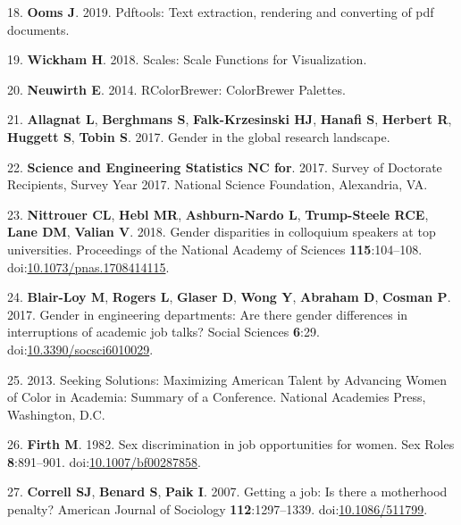 \documentclass[10pt,]{article}
\begin{document}
\hypertarget{ref-pdftools}{}
18. \textbf{Ooms J}. 2019. Pdftools: Text extraction, rendering and
converting of pdf documents.

\hypertarget{ref-wickham_scales_2018}{}
19. \textbf{Wickham H}. 2018. Scales: Scale Functions for Visualization.

\hypertarget{ref-neuwirth_rcolorbrewer_2014}{}
20. \textbf{Neuwirth E}. 2014. RColorBrewer: ColorBrewer Palettes.

\hypertarget{ref-allagnat_gender_2017}{}
21. \textbf{Allagnat L}, \textbf{Berghmans S}, \textbf{Falk-Krzesinski
HJ}, \textbf{Hanafi S}, \textbf{Herbert R}, \textbf{Huggett S},
\textbf{Tobin S}. 2017. Gender in the global research landscape.

\hypertarget{ref-nsf_survey_2017}{}
22. \textbf{Science and Engineering Statistics NC for}. 2017. Survey of
Doctorate Recipients, Survey Year 2017. National Science Foundation,
Alexandria, VA.

\hypertarget{ref-nittrouer_gender_2018}{}
23. \textbf{Nittrouer CL}, \textbf{Hebl MR}, \textbf{Ashburn-Nardo L},
\textbf{Trump-Steele RCE}, \textbf{Lane DM}, \textbf{Valian V}. 2018.
Gender disparities in colloquium speakers at top universities.
Proceedings of the National Academy of Sciences \textbf{115}:104--108.
doi:\href{https://doi.org/10.1073/pnas.1708414115}{10.1073/pnas.1708414115}.

\hypertarget{ref-BlairLoy2017}{}
24. \textbf{Blair-Loy M}, \textbf{Rogers L}, \textbf{Glaser D},
\textbf{Wong Y}, \textbf{Abraham D}, \textbf{Cosman P}. 2017. Gender in
engineering departments: Are there gender differences in interruptions
of academic job talks? Social Sciences \textbf{6}:29.
doi:\href{https://doi.org/10.3390/socsci6010029}{10.3390/socsci6010029}.

\hypertarget{ref-noauthor_seeking_2013}{}
25. 2013. Seeking Solutions: Maximizing American Talent by Advancing
Women of Color in Academia: Summary of a Conference. National Academies
Press, Washington, D.C.

\hypertarget{ref-Firth1982}{}
26. \textbf{Firth M}. 1982. Sex discrimination in job opportunities for
women. Sex Roles \textbf{8}:891--901.
doi:\href{https://doi.org/10.1007/bf00287858}{10.1007/bf00287858}.

\hypertarget{ref-Correll2007}{}
27. \textbf{Correll SJ}, \textbf{Benard S}, \textbf{Paik I}. 2007.
Getting a job: Is there a motherhood penalty? American Journal of
Sociology \textbf{112}:1297--1339.
doi:\href{https://doi.org/10.1086/511799}{10.1086/511799}.
\end{document}
